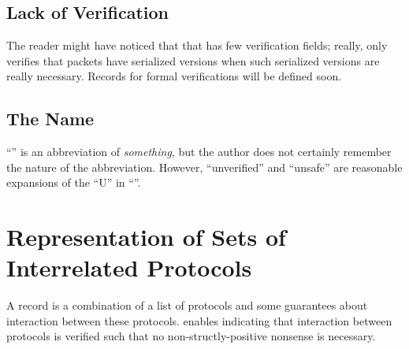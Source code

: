 \documentclass{report}
\begin{document}
\begin{itemize}
\section{Lack of Verification}
The reader might have noticed that that  has few verification fields; really,  only verifies that packets have serialized versions when such serialized versions are really necessary.  Records for formal verifications will be defined soon.

\section{The Name}
``'' is an abbreviation of \emph{something}, but the author does not certainly remember the nature of the abbreviation.  However, ``unverified'' and ``unsafe'' are reasonable expansions of the ``U'' in ``''.

\chapter{Representation of Sets of Interrelated Protocols}
A  record is a combination of a list of protocols and some guarantees about interaction between these protocols.   enables indicating that interaction between protocols is verified such that no non-structly-positive nonsense is necessary.


\end{itemize}
\end{document}

